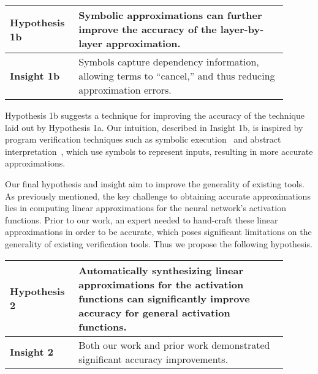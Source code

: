 \begin{table}[h]
	\centering
	\large
	\begin{tabular}{|p{0.2\linewidth}|p{0.7\linewidth}|} \hline
		\textbf{Hypothesis 1b}        &
		Symbolic approximations can further improve the accuracy of the
		layer-by-layer approximation. \\ \hline
		\textbf{Insight 1b}        &
		Symbols capture dependency information, allowing terms to
		``cancel,'' and thus reducing approximation errors. \\ \hline
	\end{tabular}
\end{table}

Hypothesis 1b suggests a technique for improving the accuracy of the technique
laid out by Hypothesis 1a. Our intuition, described in Insight 1b, is inspired by
program verification techniques such as symbolic
execution~\cite{king1976symbolic} and abstract interpretation~\cite{CousotC77},
which use symbols to represent inputs, resulting in more accurate approximations.

Our final hypothesis and insight aim to improve the generality of existing tools.
As previously mentioned, the key challenge to obtaining accurate approximations
lies in computing linear approximations for the neural network's activation
functions. Prior to our work, an expert needed to hand-craft these linear
approximations in order to be accurate, which poses significant limitations on
the generality of existing verification tools. Thus we propose the following hypothesis.

\begin{table}[h]
	\centering
	\large
	\begin{tabular}{|p{0.2\linewidth}|p{0.7\linewidth}|} \hline
		\textbf{Hypothesis 2}      &
		Automatically synthesizing linear approximations for the activation
		functions can significantly improve accuracy for general activation
		functions. \\ \hline
		\textbf{Insight 2}        &
		Both our work and prior work demonstrated significant accuracy
		improvements. \\ \hline
	\end{tabular}
\end{table}

